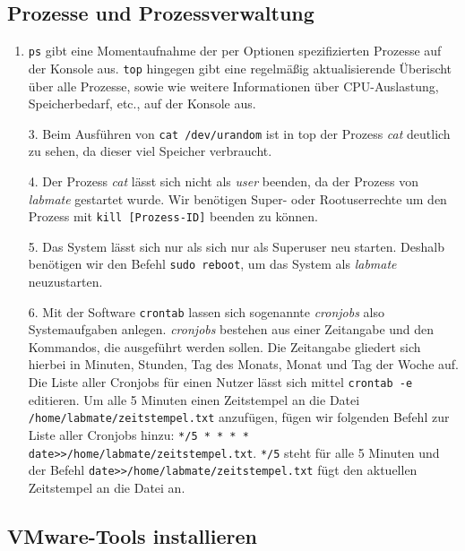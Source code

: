 \documentclass{scrartcl}
\begin{document}
    \subsection{Prozesse und Prozessverwaltung}
    \label{sub:Prozesse und Prozessverwaltung}

    \begin{enumerate} [1.]
      \item \texttt{ps} gibt eine Momentaufnahme der per Optionen spezifizierten Prozesse
            auf der Konsole aus. \texttt{top} hingegen gibt eine regelmäßig
            aktualisierende Überischt über alle Prozesse, sowie wie weitere
            Informationen über CPU-Auslastung, Speicherbedarf, etc., auf der Konsole
            aus.
      \item [3.] Beim Ausführen von \texttt{cat /dev/urandom} ist in top der Prozess
            \textit{cat} deutlich zu sehen, da dieser viel Speicher verbraucht.
      \item [4.] Der Prozess \textit{cat} lässt sich nicht als \textit{user} beenden,
            da der Prozess von \textit{labmate} gestartet wurde. Wir benötigen
            Super- oder Rootuserrechte um den Prozess mit \texttt{kill [Prozess-ID]}
            beenden zu können.
      \item [5.] Das System lässt sich nur als sich nur als Superuser neu starten.
            Deshalb benötigen wir den Befehl \texttt{sudo reboot}, um das System als
            \textit{labmate} neuzustarten.
      \item [6.] Mit der Software \texttt{crontab} lassen sich sogenannte \textit{cronjobs}
            also Systemaufgaben anlegen. \textit{cronjobs} bestehen aus einer
            Zeitangabe und den Kommandos, die ausgeführt werden sollen.
            Die Zeitangabe gliedert sich hierbei in Minuten, Stunden, Tag des Monats,
            Monat und Tag der Woche auf. Die Liste aller Cronjobs für einen Nutzer
            lässt sich mittel \texttt{crontab -e} editieren. Um alle 5 Minuten
            einen Zeitstempel an die Datei \texttt{/home/labmate/zeitstempel.txt}
            anzufügen, fügen wir folgenden Befehl zur Liste aller Cronjobs hinzu:
            \texttt{*/5 * * * * date>>/home/labmate/zeitstempel.txt}.
            \texttt{*/5} steht für alle 5 Minuten und der Befehl
            \texttt{date>>/home/labmate/zeitstempel.txt} fügt den aktuellen
            Zeitstempel an die Datei an.
    \end{enumerate}

    \subsection{VMware-Tools installieren}
    \label{sub:VMware-Tools installieren}
\end{document}
